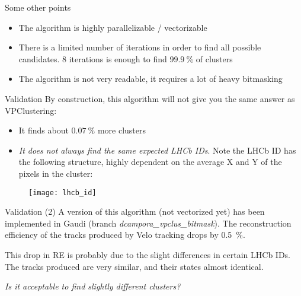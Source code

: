 \begin{frame}{Some other points}
\begin{itemize}
\item The algorithm is highly parallelizable / vectorizable
\item There is a limited number of iterations in order to find all possible candidates. 8 iterations is enough to find $99.9~\%$ of clusters
\item The algorithm is not very readable, it requires a lot of heavy bitmasking
\end{itemize}
\end{frame}

\begin{frame}{Validation}
By construction, this algorithm will not give you the same answer as VPClustering:

\begin{itemize}
\item It finds about $0.07~\%$ more clusters
\item \emph{It does not always find the same expected LHCb IDs}. Note the LHCb ID has the following structure, highly dependent on the average X and Y of the pixels in the cluster:
\end{itemize}

\begin{figure}
\texttt{[image: lhcb\_id]}
\end{figure}
\end{frame}

\begin{frame}{Validation (2)}
A version of this algorithm (not vectorized yet) has been implemented in Gaudi (branch \emph{dcampora\_vpclus\_bitmask}). The reconstruction efficiency of the tracks produced by Velo tracking drops by 0.5~\%.

This drop in RE is probably due to the slight differences in certain LHCb IDs. The tracks produced are very similar, and their states almost identical.

\begin{center}
\emph{Is it acceptable to find slightly different clusters?}
\end{center}
\end{frame}
